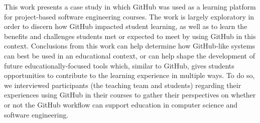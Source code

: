 

This work presents a case study in which GitHub was used as a learning platform for project-based software engineering courses. The work is largely exploratory in order to discern how GitHub impacted student learning, as well as to learn the benefits and challenges students met or expected to meet by using GitHub in this context. Conclusions from this work can help determine how GitHub-like systems can best be used in an educational context, or can help shape the development of future educationally-focused tools which, similar to GitHub, gives students opportunities to contribute to the learning experience in multiple ways. To do so, we interviewed participants (the teaching team and students) regarding their experiences using GitHub in their courses to gather their perspectives on whether or not the GitHub workflow can support education in computer science and software engineering.

